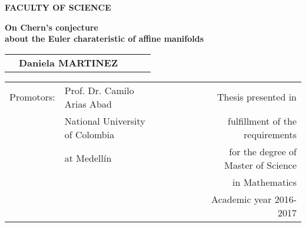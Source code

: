 
\AddToShipoutPictureFG*{\BackgroundPic}
\thispagestyle{empty}



\begin{tcolorbox}[coltext=Mahogany,colback=ForestGreen,arc=0pt,outer arc=0pt,boxrule=0.0pt,halign upper=right, height=2cm,valign=center]
 \textbf{FACULTY OF SCIENCE}
\end{tcolorbox}

\vspace{4.5cm}

\textbf{
\hspace{0.1cm} \textcolor{Mahogany}{\LARGE On Chern's conjecture} \\ 
\vspace{1cm}
\hspace{0.5cm} \textcolor{Mahogany}{ \LARGE about the Euler charateristic of affine manifolds}}

\vspace{5.5cm}

\begin{table}[ht]
\raggedleft
\begin{tabular}{lllll}
 &\textbf{\Large Daniela MARTINEZ }  & &   &
\end{tabular}
\end{table}




\vspace{4cm}

\begin{table}[ht]
\centering
\label{my-label}
\begin{tabular}{llllllr}
Promotors:   & Prof. Dr. Camilo Arias Abad       &  &  &  &  & Thesis presented in                 \\
             & National University of Colombia               &  &  &  &  & fulfillment of the requirements     \\
             &   at Medell\'in           &  &  &  &  & for the degree of Master of Science \\
             &                  &  &  &  &  & in Mathematics                                                         \\
             &                            &  &  &  &  & Academic year 2016-2017            
\end{tabular}
\end{table}



